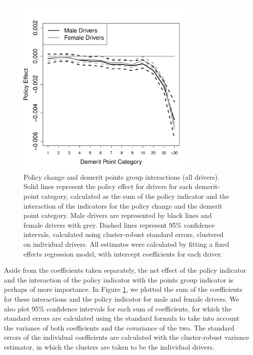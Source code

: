 \documentclass[12pt]{paper}
\begin{document}
\begin{figure}
\centering
\includegraphics[width=0.8\textwidth]{../Figures/FFX_reg_policy_points_grp_all_pts.pdf}
\caption{Policy change and demerit points group interactions (all drivers).
Solid lines represent the policy effect for drivers for each demerit-point category, 
calculated as the sum of the policy indicator and the interaction of the  indicators for the policy change 
and the demerit point category.  
Male drivers are represented by black lines and female drivers with grey. 
Dashed lines represent 95\% confidence intervals, 
calculated using cluster-robust standard errors, clustered on individual drivers. 
All estimates were calculated by fitting a fixed effects regression model, 
with intercept coefficients for each driver. 
}\label{fig:FE_regs_all_pts}
\end{figure}



Aside from the coefficients taken separately, the net effect of the policy indicator and the interaction of the policy 
indicator with the points group indicator is perhaps of more importance. 
In Figure \ref{fig:FE_regs_all_pts}, we plotted the sum of the coefficients for these interactions and the policy indicator for male and female drivers. 
We also plot 95\% confidence intervals for each sum of coefficients, 
for which the standard errors are calculated using the standard formula to take into account the variance of both coefficients and the covariance of the two.  
The standard errors of the individual coefficients are calculated with the cluster-robust variance estimator, 
in which the clusters are taken to be the individual drivers. 
\end{document}

